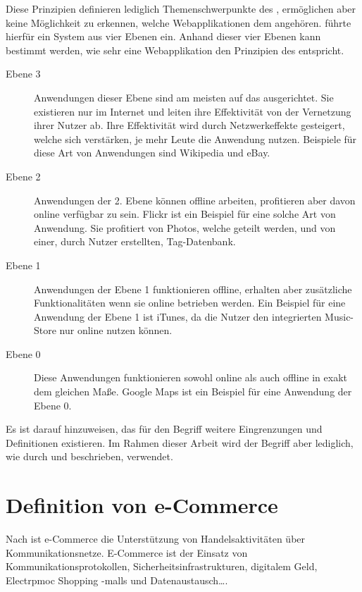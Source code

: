 Diese Prinzipien definieren lediglich Themenschwerpunkte des , ermöglichen aber keine Möglichkeit zu erkennen, welche Webapplikationen dem  angehören. \textcite{oreilly:levels-of-web20} führte hierfür ein System aus vier Ebenen ein. Anhand dieser vier Ebenen kann bestimmt werden, wie sehr eine Webapplikation den Prinzipien des  entspricht.

\begin{description}
\item[Ebene 3] Anwendungen dieser Ebene sind am meisten auf das  ausgerichtet. Sie existieren nur im Internet und leiten ihre Effektivität von der Vernetzung ihrer Nutzer ab. Ihre Effektivität wird durch Netzwerkeffekte gesteigert, welche sich verstärken, je mehr Leute die Anwendung nutzen. Beispiele für diese Art von Anwendungen sind Wikipedia und eBay.
\item[Ebene 2] Anwendungen der 2. Ebene können offline arbeiten, profitieren aber davon online verfügbar zu sein. Flickr ist ein Beispiel für eine solche Art von Anwendung. Sie profitiert von Photos, welche geteilt werden, und von einer, durch Nutzer erstellten, Tag-Datenbank.
\item[Ebene 1] Anwendungen der Ebene 1 funktionieren offline, erhalten aber zusätzliche Funktionalitäten wenn sie online betrieben werden. Ein Beispiel für eine Anwendung der Ebene 1 ist iTunes, da die Nutzer den integrierten Music-Store nur online nutzen können.
\item[Ebene 0] Diese Anwendungen funktionieren sowohl online als auch offline in exakt dem gleichen Maße. Google Maps ist ein Beispiel für eine Anwendung der Ebene 0.
\end{description}

Es ist darauf hinzuweisen, das für den Begriff  weitere Eingrenzungen und Definitionen existieren. Im Rahmen dieser Arbeit wird der Begriff aber lediglich, wie durch \textcite{oreilly:web20} und \textcite{oreilly:levels-of-web20} beschrieben, verwendet.


\section{Definition von  e-Commerce}

Nach \textcite[S. 20]{merz:e-commerce} ist e-Commerce  \glqq die Unterstützung von Handelsaktivitäten über Kommunikationsnetze\grqq. E-Commerce ist der Einsatz von Kommunikationsprotokollen, Sicherheitsinfrastrukturen, digitalem Geld, Electrpmoc Shopping -malls und Datenaustausch….\grqq



